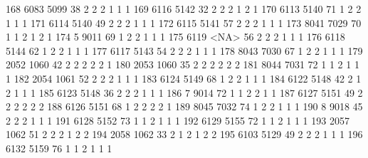 \documentclass[
  letterpaper,
  DIV=11,
  numbers=noendperiod]{scrreprt}
\newenvironment{Shaded}{\begin{snugshade}}{\end{snugshade}}
\newcommand{\NormalTok}[1]{\textcolor[rgb]{0.00,0.23,0.31}{#1}}
\begin{document}
\begin{Shaded}
\begin{Highlighting}[]
\NormalTok{168 6083 5099  38          2      2        2         1    1                 1}
\NormalTok{169 6116 5142  32          2      2        2         1    2                 1}
\NormalTok{170 6113 5140  71          1      2        2         1    1                 1}
\NormalTok{171 6114 5140  49          2      2        2         1    1                 1}
\NormalTok{172 6115 5141  57          2      2        2         1    1                 1}
\NormalTok{173 8041 7029  70          1      1        2         1    2                 1}
\NormalTok{174    5 9011  69          1      2        2         1    1                 1}
\NormalTok{175 6119 \textless{}NA\textgreater{}  56          2      2        2         1    1                 1}
\NormalTok{176 6118 5144  62          1      2        2         1    1                 1}
\NormalTok{177 6117 5143  54          2      2        2         1    1                 1}
\NormalTok{178 8043 7030  67          1      2        2         1    1                 1}
\NormalTok{179 2052 1060  42          2      2        2         2    2                 1}
\NormalTok{180 2053 1060  35          2      2        2         2    2                 2}
\NormalTok{181 8044 7031  72          1      1        2         1    1                 1}
\NormalTok{182 2054 1061  52          2      2        2         1    1                 1}
\NormalTok{183 6124 5149  68          1      2        2         1    1                 1}
\NormalTok{184 6122 5148  42          2      1        2         1    1                 1}
\NormalTok{185 6123 5148  36          2      2        2         1    1                 1}
\NormalTok{186    7 9014  72          1      1        2         2    1                 1}
\NormalTok{187 6127 5151  49          2      2        2         2    2                 2}
\NormalTok{188 6126 5151  68          1      2        2         2    2                 1}
\NormalTok{189 8045 7032  74          1      2        2         1    1                 1}
\NormalTok{190    8 9018  45          2      2        2         1    1                 1}
\NormalTok{191 6128 5152  73          1      1        2         1    1                 1}
\NormalTok{192 6129 5155  72          1      1        2         1    1                 1}
\NormalTok{193 2057 1062  51          2      2        2         1    2                 2}
\NormalTok{194 2058 1062  33          2      1        2         1    2                 2}
\NormalTok{195 6103 5129  49          2      2        2         1    1                 1}
\NormalTok{196 6132 5159  76          1      1        2         1    1                 1}

\end{Highlighting}
\end{Shaded}
\end{document}
